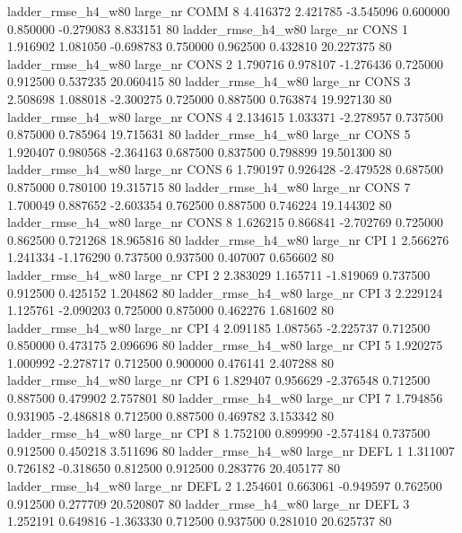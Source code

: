  ladder_rmse_h4_w80   large_nr     COMM                 8  4.416372  2.421785  -3.545096 0.600000 0.850000 -0.279083    8.833151 80
 ladder_rmse_h4_w80   large_nr     CONS                 1  1.916902  1.081050  -0.698783 0.750000 0.962500  0.432810   20.227375 80
 ladder_rmse_h4_w80   large_nr     CONS                 2  1.790716  0.978107  -1.276436 0.725000 0.912500  0.537235   20.060415 80
 ladder_rmse_h4_w80   large_nr     CONS                 3  2.508698  1.088018  -2.300275 0.725000 0.887500  0.763874   19.927130 80
 ladder_rmse_h4_w80   large_nr     CONS                 4  2.134615  1.033371  -2.278957 0.737500 0.875000  0.785964   19.715631 80
 ladder_rmse_h4_w80   large_nr     CONS                 5  1.920407  0.980568  -2.364163 0.687500 0.837500  0.798899   19.501300 80
 ladder_rmse_h4_w80   large_nr     CONS                 6  1.790197  0.926428  -2.479528 0.687500 0.875000  0.780100   19.315715 80
 ladder_rmse_h4_w80   large_nr     CONS                 7  1.700049  0.887652  -2.603354 0.762500 0.887500  0.746224   19.144302 80
 ladder_rmse_h4_w80   large_nr     CONS                 8  1.626215  0.866841  -2.702769 0.725000 0.862500  0.721268   18.965816 80
 ladder_rmse_h4_w80   large_nr      CPI                 1  2.566276  1.241334  -1.176290 0.737500 0.937500  0.407007    0.656602 80
 ladder_rmse_h4_w80   large_nr      CPI                 2  2.383029  1.165711  -1.819069 0.737500 0.912500  0.425152    1.204862 80
 ladder_rmse_h4_w80   large_nr      CPI                 3  2.229124  1.125761  -2.090203 0.725000 0.875000  0.462276    1.681602 80
 ladder_rmse_h4_w80   large_nr      CPI                 4  2.091185  1.087565  -2.225737 0.712500 0.850000  0.473175    2.096696 80
 ladder_rmse_h4_w80   large_nr      CPI                 5  1.920275  1.000992  -2.278717 0.712500 0.900000  0.476141    2.407288 80
 ladder_rmse_h4_w80   large_nr      CPI                 6  1.829407  0.956629  -2.376548 0.712500 0.887500  0.479902    2.757801 80
 ladder_rmse_h4_w80   large_nr      CPI                 7  1.794856  0.931905  -2.486818 0.712500 0.887500  0.469782    3.153342 80
 ladder_rmse_h4_w80   large_nr      CPI                 8  1.752100  0.899990  -2.574184 0.737500 0.912500  0.450218    3.511696 80
 ladder_rmse_h4_w80   large_nr     DEFL                 1  1.311007  0.726182  -0.318650 0.812500 0.912500  0.283776   20.405177 80
 ladder_rmse_h4_w80   large_nr     DEFL                 2  1.254601  0.663061  -0.949597 0.762500 0.912500  0.277709   20.520807 80
 ladder_rmse_h4_w80   large_nr     DEFL                 3  1.252191  0.649816  -1.363330 0.712500 0.937500  0.281010   20.625737 80
